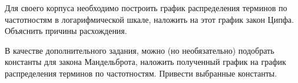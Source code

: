 \pagebreak
{}

Для своего корпуса необходимо построить график распределения терминов по частотностям в логарифмической шкале, наложить на этот график закон Ципфа. Объяснить причины расхождения.

В качестве дополнительного задания, можно (но необязательно) подобрать константы для закона Мандельброта, наложить полученный график на график распределения терминов по частотностям. Привести выбранные константы.
